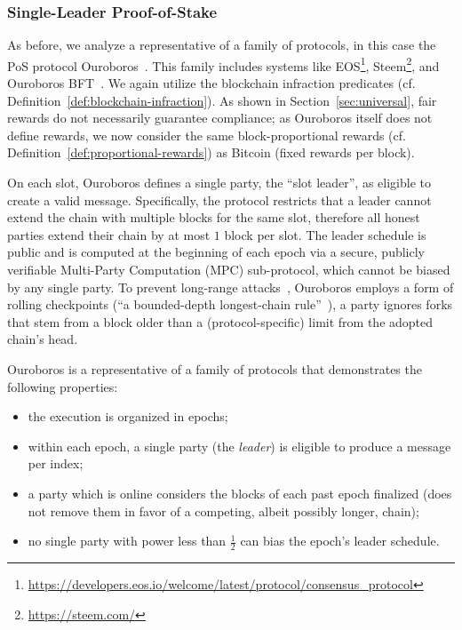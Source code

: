 \subsubsection{Single-Leader Proof-of-Stake}\label{subsec:single-leader-pos}

As before, we analyze a representative of a family of protocols, in
this case the PoS protocol Ouroboros~\cite{C:KRDO17}.
This family includes systems like
EOS\footnote{\url{https://developers.eos.io/welcome/latest/protocol/consensus_protocol}},
Steem\footnote{\url{https://steem.com/}}, and Ouroboros
BFT~\cite{EPRINT:KiaRus18}.
We again utilize the blockchain infraction predicates (cf.
Definition~\ref{def:blockchain-infraction}).
As shown in Section~\ref{sec:universal}, fair rewards do not necessarily
guarantee compliance; as Ouroboros itself does not define rewards, we now
consider the same block-proportional rewards (cf.
Definition~\ref{def:proportional-rewards}) as Bitcoin (\ie fixed rewards per block).

On each slot, Ouroboros defines a single party, the ``slot leader'', as
eligible to create a valid message. Specifically, the protocol restricts that
a leader cannot extend the chain with multiple blocks for the same slot,
therefore all honest parties extend their chain by at most $1$ block per slot.
The leader schedule is public and is computed at the
beginning of each epoch via a secure, publicly verifiable Multi-Party
Computation (MPC) sub-protocol, which cannot be biased by any single party. To
prevent long-range attacks~\cite{buterin2014stake}, Ouroboros employs a form of
rolling checkpoints (``a bounded-depth longest-chain rule''~\cite{C:KRDO17}),
\ie a party ignores forks that stem from a block older than a
(protocol-specific) limit from the adopted chain's head.

Ouroboros is a representative of a family of protocols that demonstrates the following properties:
\begin{itemize}
    \item the execution is organized in epochs;
    \item within each epoch, a single party (the \emph{leader}) is eligible to
        produce a message per index;
    \item a party which is online considers the blocks of each past epoch
        finalized (\ie does not remove them in favor of a competing, albeit
        possibly longer, chain);
    \item no single party with power less than $\frac{1}{2}$ can bias the
        epoch's leader schedule.
\end{itemize}



